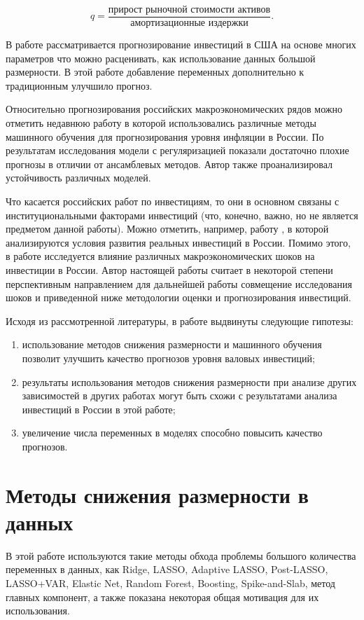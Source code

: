 \begin{equation}
    q = \frac{\text{прирост рыночной стоимости активов}}{\text{амортизационные издержки}}.
\end{equation}

В работе \cite{rapachforecasting} рассматривается прогнозирование инвестиций в США на основе многих параметров что можно расценивать, как использование данных большой размерности. В этой работе добавление переменных дополнительно к традиционным улучшило прогноз.

 Относительно прогнозирования российских макроэкономических рядов можно отметить недавнюю работу \cite{baybuza2018inflation}
 в которой использовались различные методы машинного обучения для прогнозирования уровня инфляции в России. По результатам исследования модели с регуляризацией показали достаточно плохие прогнозы в отличии от ансамблевых методов. Автор также проанализировал устойчивость различных моделей.
 
 Что касается российских работ по инвестициям, то они в основном связаны с институциональными факторами инвестиций (что, конечно, важно, но не является предметом данной работы). Можно отметить, например, работу \cite{фирсов2014условия}, в которой анализируются условия развития реальных инвестиций в России. Помимо этого, в работе \cite{шоломицкая2017влияние} исследуется влияние различных макроэкономических шоков на инвестиции в России. Автор настоящей работы считает в некоторой степени перспективным направлением для дальнейшей работы совмещение исследования шоков и приведенной ниже методологии оценки и прогнозирования инвестиций.
 
 Исходя из рассмотренной литературы, в работе выдвинуты следующие гипотезы:
 
 \begin{enumerate}
	\item использование методов снижения размерности и машинного обучения позволит улучшить качество прогнозов уровня валовых инвестиций;
	\item результаты использования методов снижения размерности при анализе других зависимостей в других работах могут быть схожи с результатами анализа инвестиций в России в этой работе;
	\item увеличение числа переменных в моделях способно повысить качество прогнозов.
	 \end{enumerate}
 
\chapter{Методы снижения размерности в данных} \label{ch:models}
В этой работе используются такие методы обхода проблемы большого количества переменных в данных, как Ridge, LASSO, Adaptive LASSO, Post-LASSO, LASSO+VAR, Elastic Net, Random Forest, Boosting, Spike-and-Slab, метод главных компонент, а также показана некоторая общая мотивация для их использования.
